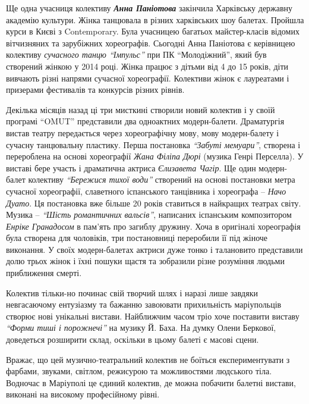
Ще одна учасниця колективу \emph{\textbf{Анна Паніотова}} закінчила Харківську державну
академію культури. Жінка танцювала в різних харківських шоу балетах. Пройшла
курси в Києві з Contemporary. Була учасницею багатьох майстер-класів відомих
вітчизняних та зарубіжних хореографів. Сьогодні Анна Паніотова є керівницею
колективу \emph{сучасного танцю \enquote{Імпульс}} при ПК \enquote{Молодіжний}, який був створений
жінкою у 2014 році. Жінка працює з дітьми від 4 до 15 років, діти вивчають
різні напрями сучасної хореографії. Колективи жінок є лауреатами і призерами
фестивалів та конкурсів різних рівнів.


Декілька місяців назад ці три мисткині створили новий колектив і у своїй
програмі \enquote{OMUT} представили два одноактних модерн-балети. Драматургія вистав
театру передається через хореографічну мову, мову модерн-балету і сучасну
танцювальну пластику. Перша постановка \emph{\enquote{Забуті мемуари}}, створена і перероблена
на основі хореографії \emph{Жана Філіпа Дюрі} (музика Генрі Перселла). У виставі бере
участь і драматична актриса \emph{Єлизавета Чагір}. Ще один модерн-балет колективу
\emph{\enquote{Бережися тихої води}} створений на основі постановки метра сучасної
хореографії, славетного іспанського танцівника і хореографа – \emph{Начо Дуато}. Ця
постановка вже більше 20 років ставиться в найкращих театрах світу. Музика –
\emph{\enquote{Шість романтичних вальсів}}, написаних іспанським композитором \emph{Енріке
Гранадосом}  в пам'ять про загиблу дружину. Хоча в оригіналі хореографія була
створена для чоловіків, три постановниці переробили її під жіноче виконання. У
своїх модерн-балетах актриси дуже тонко і талановито представили долю трьох
жінок і їхні пошуки щастя та зобразили різне розуміння людьми приближення
смерті.


Колектив тільки-но починає свій творчий шлях і наразі лише завдяки невгасаючому
ентузіазму та бажанню завоювати прихильність маріупольців створює нові
унікальні вистави. Найближчим часом тріо хоче поставити виставу \emph{\enquote{Форми тиші і
порожнечі}} на музику Й. Баха. На думку Олени Беркової, доведеться розширити
склад, оскільки в цьому балеті є масові сцени.

Вражає, що цей музично-театральний колектив не боїться експериментувати з
фарбами, звуками, світлом, режисурою та можливостями людського тіла. Водночас в
Маріуполі це єдиний колектив, де можна побачити балетні вистави, виконані на
високому професійному рівні.

